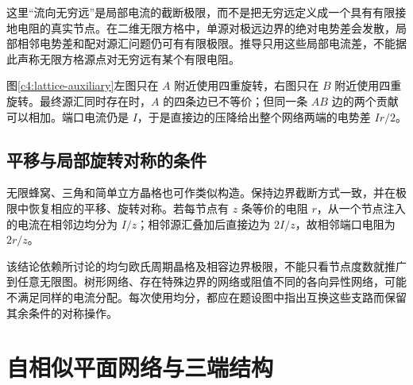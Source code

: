 这里“流向无穷远”是局部电流的截断极限，而不是把无穷远定义成一个具有有限接地电阻的真实节点。在二维无限方格中，单源对极远边界的绝对电势差会发散，局部相邻电势差和配对源汇问题仍可有有限极限。推导只用这些局部电流差，不能据此声称无限方格源点对无穷远有某个有限电阻。

图\ref{c4:lattice-auxiliary}左图只在 $A$ 附近使用四重旋转，右图只在 $B$ 附近使用四重旋转。最终源汇同时存在时，$A$ 的四条边已不等价；但同一条 $AB$ 边的两个贡献可以相加。端口电流仍是 $I$，于是直接边的压降给出整个网络两端的电势差 $Ir/2$。

\subsection{平移与局部旋转对称的条件}

无限蜂窝、三角和简单立方晶格也可作类似构造。保持边界截断方式一致，并在极限中恢复相应的平移、旋转对称。若每节点有 $z$ 条等价的电阻 $r$，从一个节点注入的电流在相邻边均分为 $I/z$；相邻源汇叠加后直接边为 $2I/z$，故相邻端口电阻为 $2r/z$。

该结论依赖所讨论的均匀欧氏周期晶格及相容边界极限，不能只看节点度数就推广到任意无限图。树形网络、存在特殊边界的网络或阻值不同的各向异性网络，可能不满足同样的电流分配。每次使用均分，都应在题设图中指出互换这些支路而保留其余条件的对称操作。


\section{自相似平面网络与三端结构}
